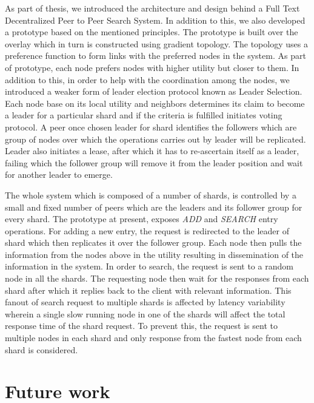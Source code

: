 \documentclass[a4paper,11pt]{kth-mag}
\begin{document}
As part of thesis, we introduced the architecture and design behind a Full Text Decentralized Peer to Peer Search System. In addition to this, we also developed a prototype based on the mentioned principles. The prototype is built over the overlay which in turn is constructed using gradient topology. The topology uses a preference function to form links with the preferred nodes in the system. As part of prototype, each node prefers nodes with higher utility but closer to them. In addition to this, in order to help with the coordination among the nodes, we introduced a weaker form of leader election protocol known as Leader Selection. Each node base on its local utility and neighbors determines its claim to become a leader for a particular shard and if the criteria is fulfilled initiates voting protocol. A peer once chosen leader for shard identifies the followers which are group of nodes over which the operations carries out by leader will be replicated. Leader also initiates a lease, after which it has to re-ascertain itself as a leader, failing which the follower group will remove it from the leader position and wait for another leader to emerge.
\par The whole system which is composed of a number of shards, is controlled by a small and fixed number of peers which are the leaders and its follower group for every shard. The prototype at present, exposes \textit{ADD} and \textit{SEARCH} entry operations. For adding a new entry, the request is redirected to the leader of shard which then replicates it over the follower group. Each node then pulls the information from the nodes above in the utility resulting in dissemination of the information in the system. In order to search, the request is sent to a random node in all the shards. The requesting node then wait for the responses from each shard after which it replies back to the client with relevant information. This fanout of search request to multiple shards is affected by latency variability wherein a single slow running node in one of the shards will affect the total response time of the shard request. To prevent this, the request is sent to multiple nodes in each shard and only response from the fastest node from each shard is considered.

\section{Future work}
\label{sec:future-work}
\end{document}
